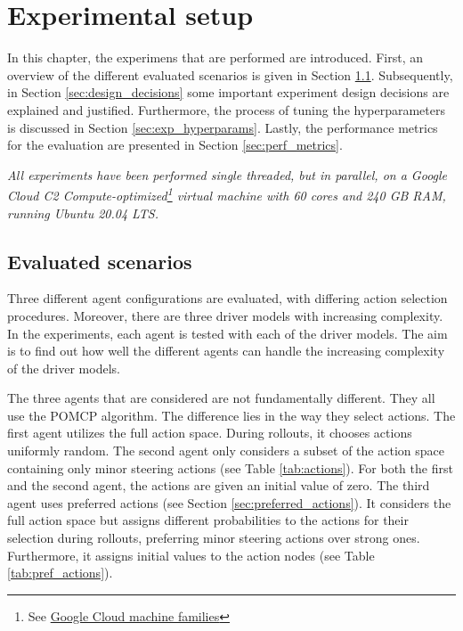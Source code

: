 \chapter{Experimental setup}
\label{sec:setup}



In this chapter, the experimens that are performed are introduced. First, an overview of the different evaluated scenarios is given in Section \ref{sec:scenarios}. Subsequently, in Section \ref{sec:design_decisions} some important experiment design decisions are explained and justified. Furthermore, the process of tuning the hyperparameters is discussed in Section \ref{sec:exp_hyperparams}. Lastly, the performance metrics for the evaluation are presented in Section \ref{sec:perf_metrics}.

\emph{All experiments have been performed single threaded, but in parallel, on a Google Cloud C2 Compute-optimized\footnote{See \href{https://cloud.google.com/compute/docs/machine-types}{Google Cloud machine families}} virtual machine with 60 cores and 240 GB RAM, running Ubuntu 20.04 LTS.}



\section{Evaluated scenarios}
\label{sec:scenarios}

Three different agent configurations are evaluated, with differing action selection procedures. Moreover, there are three driver models with increasing complexity. In the experiments, each agent is tested with each of the driver models. The aim is to find out how well the different agents can handle the increasing complexity of the driver models.

The three agents that are considered are not fundamentally different. They all use the POMCP algorithm. The difference lies in the way they select actions. The first agent utilizes the full action space. During rollouts, it chooses actions uniformly random. The second agent only considers a subset of the action space containing only minor steering actions (see Table \ref{tab:actions}). For both the first and the second agent, the actions are given an initial value of zero. The third agent uses preferred actions (see Section \ref{sec:preferred_actions}). It considers the full action space but assigns different probabilities to the actions for their selection during rollouts, preferring minor steering actions over strong ones. Furthermore, it assigns initial values to the action nodes (see Table \ref{tab:pref_actions}).

